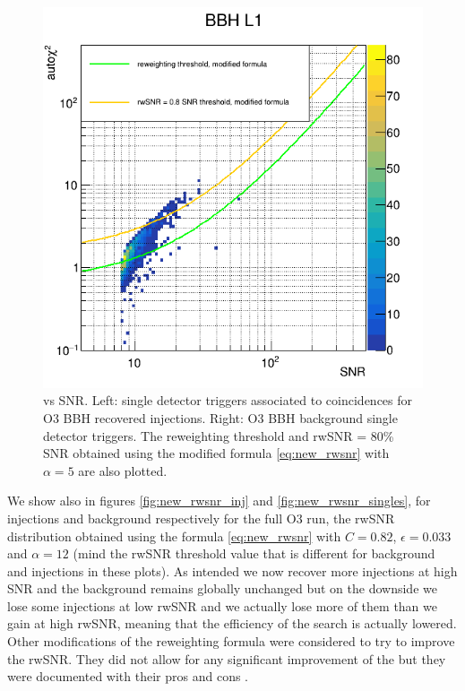 \begin{figure}[ht]
\begin{minipage}{0.45\linewidth}
    \includegraphics[width=\textwidth]{sectionImprovement/rwSNR/cSnrAchi2_singles_new_L1.png}
  \end{minipage}
  \hfill
  \caption{\achi vs SNR. Left: single detector triggers associated to coincidences for O3 BBH recovered injections. Right: O3 BBH background single detector triggers. The reweighting threshold and rwSNR = 80\% SNR obtained using the modified formula \ref{eq:new_rwsnr} with $\alpha = 5$ are also plotted.}
  \label{fig:new_thresholds}
\end{figure}

We show also in figures \ref{fig:new_rwsnr_inj} and \ref{fig:new_rwsnr_singles}, for injections and background respectively for the full O3 run, the rwSNR distribution obtained using the formula \ref{eq:new_rwsnr} with $C=0.82$, $\epsilon=0.033$ and $\alpha=12$ (mind the rwSNR threshold value that is different for background and injections in these plots).
As intended we now recover more injections at high SNR and the background remains globally unchanged but on the downside we lose some injections at low rwSNR and we actually lose more of them than we gain at high rwSNR, meaning that the efficiency of the search is actually lowered.
Other modifications of the reweighting formula were considered to try to improve the rwSNR.
They did not allow for any significant improvement of the \achi but they were documented with their pros and cons \cite{technote_rwsnr}.

